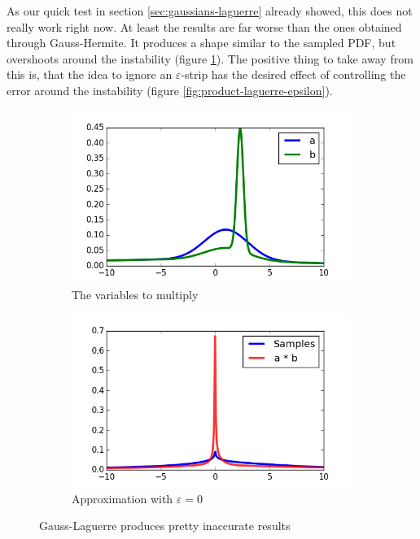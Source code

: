 \documentclass[11pt,a4paper]{book}
\begin{document}
As our quick test in section \ref{sec:gaussians-laguerre} already showed, this
does not really work right now. At least the results are far worse than the ones
obtained through Gauss-Hermite. It produces a shape similar to the sampled PDF,
but overshoots around the instability (figure \ref{fig:product-laguerre}). The
positive thing to take away from this is, that the idea to ignore an
$\varepsilon$-strip has the desired effect of controlling the error around the
instability (figure \ref{fig:product-laguerre-epsilon}).
\begin{figure}[h]
  \centering
  \begin{subfigure}[t]{0.45\textwidth}
    \centering
    \includegraphics[width=\textwidth]{thesis/operations/product-laguerre-vars}
    \caption{The variables to multiply}
  \end{subfigure}
  \hfill
  \begin{subfigure}[t]{0.45\textwidth}
    \centering
    \includegraphics[width=\textwidth]{thesis/operations/product-laguerre-0}
    \caption{Approximation with $\varepsilon = 0$}
  \end{subfigure}
  \caption{Gauss-Laguerre produces pretty inaccurate results}
  \label{fig:product-laguerre}
\end{figure}
\end{document}
